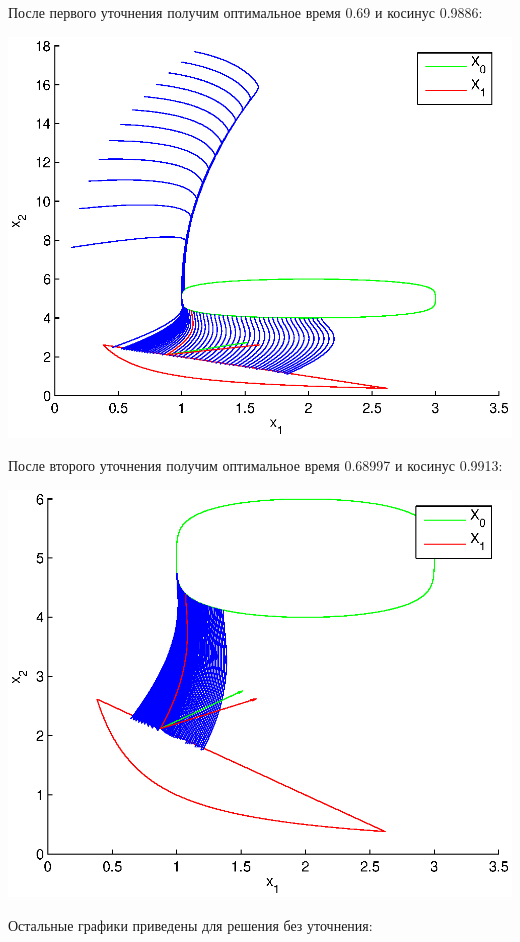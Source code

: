 \documentclass[11pt]{article}
\begin{document}
После первого уточнения получим оптимальное время 0.69 и косинус 0.9886:

\includegraphics[scale=1]{pics/pic1_x_clar1.eps}

После второго уточнения получим оптимальное время 0.68997 и косинус 0.9913:

\includegraphics[scale=1]{pics/pic1_x_clar2.eps}

Остальные графики приведены для решения без уточнения:
\end{document}
